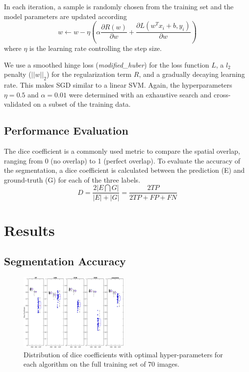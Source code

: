 \documentclass[journal]{IEEEtran}
\begin{document}
In each iteration, a sample is randomly chosen from the training set and the model parameters are updated according
\begin{equation}
w \leftarrow w - \eta \left(\alpha \frac{\partial R(w)}{\partial w} + \frac{\partial L (w^Tx_i + b, y_i)}{\partial w} \right)
\end{equation}
where $\eta$ is the learning rate controlling the step size.

We use a smoothed hinge loss (\textit{modified\_huber}) for the loss function $L$, a $l_2$ penalty ($||w||_2$) for the regularization term $R$, and a gradually decaying learning rate. This makes SGD similar to a linear SVM. Again, the hyperparameters $\eta = 0.5$ and $\alpha = 0.01$ were determined with an exhaustive search and cross-validated on a subset of the training data.


\subsection{Performance Evaluation}\label{ch.eval}
The dice coefficient is a commonly used metric to compare the spatial overlap, ranging from 0 (no overlap) to 1 (perfect overlap). To evaluate the accuracy of the segmentation, a dice coefficient is calculated between the prediction (E) and ground-truth (G) for each of the three labels. 
\begin{equation}
D = \frac{2|E \bigcap G|}{|E| + |G|} = \frac{2 TP}{2 TP + FP + FN}
\end{equation}

\section{Results}
\subsection{Segmentation Accuracy}
\begin{figure}
	\centering
	\includegraphics[width=0.48\textwidth]{images/boxplot}
	\caption{Distribution of dice coefficients with optimal hyper-parameters for each algorithm on the full training set of 70 images.}\label{f.boxplot}
\end{figure}
\end{document}
